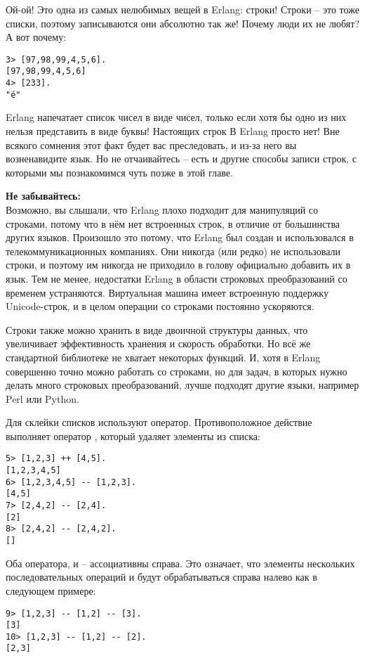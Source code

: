 Ой\--ой!
Это одна из самых нелюбимых вещей в Erlang: строки!
Строки \--- это тоже списки, поэтому записываются они абсолютно так же!
Почему люди их не любят?
А вот почему:
\begin{lstlisting}[style=repl]
3> [97,98,99,4,5,6].
[97,98,99,4,5,6]
4> [233].
"é"
\end{lstlisting}

Erlang напечатает список чисел в виде чисел, только если хотя бы одно из них нельзя представить в виде буквы!
Настоящих строк В Erlang просто нет!
Вне всякого сомнения этот факт будет вас преследовать, и из\--за него вы возненавидите язык.
Но не отчаивайтесь \--- есть и другие способы записи строк, с которыми мы познакомимся чуть позже в этой главе.\\ 
\colorbox{lorange}
{
    \begin{minipage}{1.0\linewidth}
        \textbf{Не забывайтесь:}\\ 
        Возможно, вы слышали, что Erlang плохо подходит для манипуляций со строками, потому что в нём нет встроенных строк, в отличие от большинства других языков.
        Произошло это потому, что Erlang был создан и использовался в телекоммуникационных компаниях.
        Они никогда (или редко) не использовали строки, и поэтому им никогда не приходило в голову официально добавить их в язык.
        Тем не менее, недостатки Erlang в области строковых преобразований со временем устраняются.
        Виртуальная машина имеет встроенную поддержку Unicode\--строк, и в целом операции со строками постоянно ускоряются.
        
        Строки также можно хранить в виде двоичной структуры данных, что увеличивает эффективность хранения и скорость обработки.
        Но всё же стандартной библиотеке не хватает некоторых функций.
        И, хотя в Erlang совершенно точно можно работать со строками, но для задач, в которых нужно делать много строковых преобразований, лучше подходят другие языки, например Perl или Python.
    \end{minipage}
}

Для склейки списков используют оператор\ops{++}.
Противоположное действие выполняет оператор \ops{$--$}, который удаляет элементы из списка:
\begin{lstlisting}[style=repl]
5> [1,2,3] ++ [4,5].
[1,2,3,4,5]
6> [1,2,3,4,5] -- [1,2,3].
[4,5]
7> [2,4,2] -- [2,4].
[2]
8> [2,4,2] -- [2,4,2].
[]
\end{lstlisting}

Оба оператора, \ops{++} и \ops{$--$} \--- ассоциативны справа.
Это означает, что элементы нескольких последовательных операций \ops{++} и \ops{$--$} будут обрабатываться справа налево как в следующем примере:
\begin{lstlisting}[style=repl]
9> [1,2,3] -- [1,2] -- [3].
[3]
10> [1,2,3] -- [1,2] -- [2].
[2,3]
\end{lstlisting}

